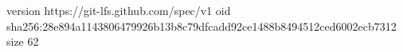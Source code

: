 version https://git-lfs.github.com/spec/v1
oid sha256:28e894a1143806479926b13b8c79dfcadd92ce1488b8494512ced6002ecb7312
size 62
